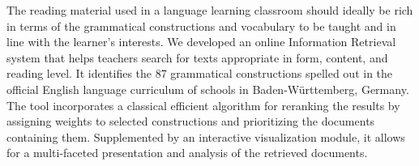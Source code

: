 The reading material used in a language learning classroom should ideally be rich in terms of the grammatical constructions and vocabulary to be taught and in line with the learner's interests. We developed an online Information Retrieval system that helps teachers search for texts appropriate in form, content, and reading level. It identifies the 87 grammatical constructions spelled out in the official English language curriculum of schools in Baden-Württemberg, Germany. The tool incorporates a classical efficient algorithm for reranking the results by assigning weights to selected constructions and prioritizing the documents containing them. Supplemented by an interactive visualization module, it allows for a multi-faceted presentation and analysis of the retrieved documents.
